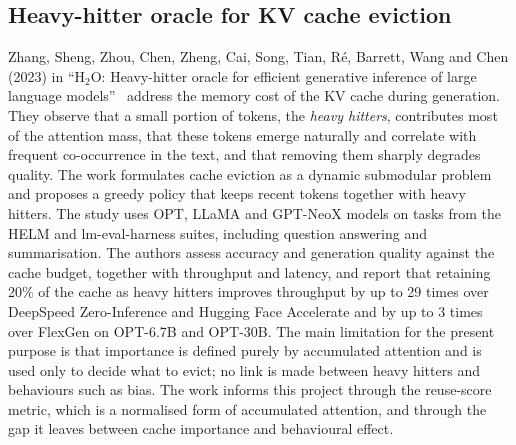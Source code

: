 \subsection{Heavy-hitter oracle for KV cache eviction}\label{lit:h2o}
Zhang, Sheng, Zhou, Chen, Zheng, Cai, Song, Tian, R\'e, Barrett, Wang and Chen (2023) in ``H$_2$O: Heavy-hitter oracle for efficient generative inference of large language models''~\cite{zhang2023h2o} address the memory cost of the KV cache during generation. They observe that a small portion of tokens, the \emph{heavy hitters}, contributes most of the attention mass, that these tokens emerge naturally and correlate with frequent co-occurrence in the text, and that removing them sharply degrades quality. The work formulates cache eviction as a dynamic submodular problem and proposes a greedy policy that keeps recent tokens together with heavy hitters. The study uses OPT, LLaMA and GPT-NeoX models on tasks from the HELM and lm-eval-harness suites, including question answering and summarisation. The authors assess accuracy and generation quality against the cache budget, together with throughput and latency, and report that retaining 20\% of the cache as heavy hitters improves throughput by up to 29 times over DeepSpeed Zero-Inference and Hugging Face Accelerate and by up to 3 times over FlexGen on OPT-6.7B and OPT-30B. The main limitation for the present purpose is that importance is defined purely by accumulated attention and is used only to decide what to evict; no link is made between heavy hitters and behaviours such as bias. The work informs this project through the reuse-score metric, which is a normalised form of accumulated attention, and through the gap it leaves between cache importance and behavioural effect.

